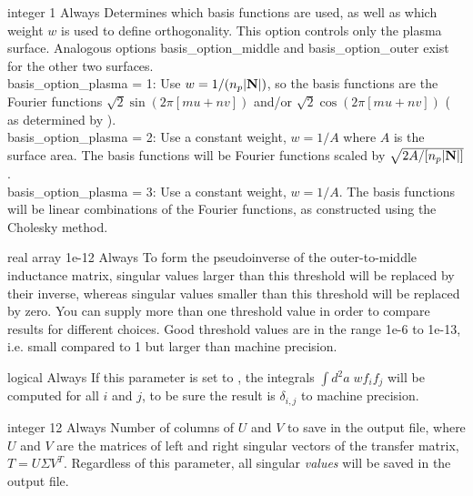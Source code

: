 \myhrule

{integer}
{1}
{Always}
{Determines which basis functions are used, as well as which weight $w$ is used to define orthogonality.
This option controls only the plasma surface. Analogous options {\ttfamily basis\_option\_middle} and {\ttfamily basis\_option\_outer}
exist for the other two surfaces.\\

{\ttfamily basis\_option\_plasma} = 1: Use $w = 1 / (n_p |{\mathbf N}|)$, so the basis functions
are the Fourier functions $\sqrt{2} \sin(2\pi[mu+nv])$ and/or $\sqrt{2} \cos(2\pi[mu+nv])$ (
as determined by ).\\

{\ttfamily basis\_option\_plasma} = 2: Use a constant weight, $w = 1/A$ where $A$ is the surface area. The basis functions
will be Fourier functions scaled by $\sqrt{2A/[n_p |{\mathbf N}|]}$.\\

{\ttfamily basis\_option\_plasma} = 3: Use a constant weight, $w = 1/A$. The basis functions
will be linear combinations of the Fourier functions, as constructed using the Cholesky method.
}

\myhrule

{real array}
{1e-12}
{Always}
{To form the pseudoinverse of the outer-to-middle inductance matrix, singular values larger than this threshold
will be replaced by their inverse, whereas singular values smaller than this threshold will be replaced by zero.
You can supply more than one threshold value in order to compare results for different choices.
Good threshold values are in the range 1e-6 to 1e-13, i.e. small compared to 1 but larger than machine precision.}

\myhrule

{logical}
{\false}
{Always}
{If this parameter is set to \true, the integrals $\int d^2a\; w f_i f_j$ will be computed for all $i$ and $j$,
to be sure the result is $\delta_{i,j}$ to machine precision.}

\myhrule

{integer}
{12}
{Always}
{Number of columns of $U$ and $V$ to save in the output file, where $U$ and $V$ are the matrices of left and right singular vectors of the transfer matrix,
$T = U\Sigma V^{T}$.
Regardless of this parameter, all singular \emph{values} will be saved in the output file.}

